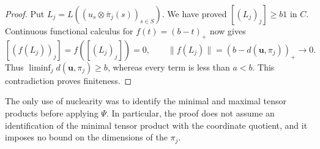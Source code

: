 \begin{proof}
Put $L_j=L((u_s\otimes\bar\pi_j(s))_{s\in S})$. We have proved
$[(L_j)_j]\geq b1$ in $C$. Continuous functional calculus for
$f(t)=(b-t)_+$ now gives
\[
 [(f(L_j))_j]=f([(L_j)_j])=0,
 \qquad
 \|f(L_j)\|=(b-d(\mathbf u,\pi_j))_+\longrightarrow0.
\]
Thus $\liminf_j d(\mathbf u,\pi_j)\geq b$, whereas every term is
less than $a<b$. This contradiction proves finiteness.
\end{proof}

The only use of nuclearity was to identify the minimal and maximal tensor
products before applying $\Psi$. In particular, the proof does not assume
an identification of the minimal tensor product with the coordinate
quotient, and it imposes no bound on the dimensions of the $\pi_j$.
